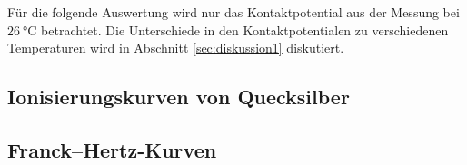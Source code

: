 Für die folgende Auswertung wird nur das Kontaktpotential aus der Messung bei $\SI{26}{\degreeCelsius}$ betrachtet.
Die Unterschiede in den Kontaktpotentialen zu verschiedenen Temperaturen wird in Abschnitt \ref{sec:diskussion1} diskutiert.

\subsection{Ionisierungskurven von Quecksilber} %
\label{sec:ion}


\subsection{Franck--Hertz-Kurven} %
\label{sec:fhk}

